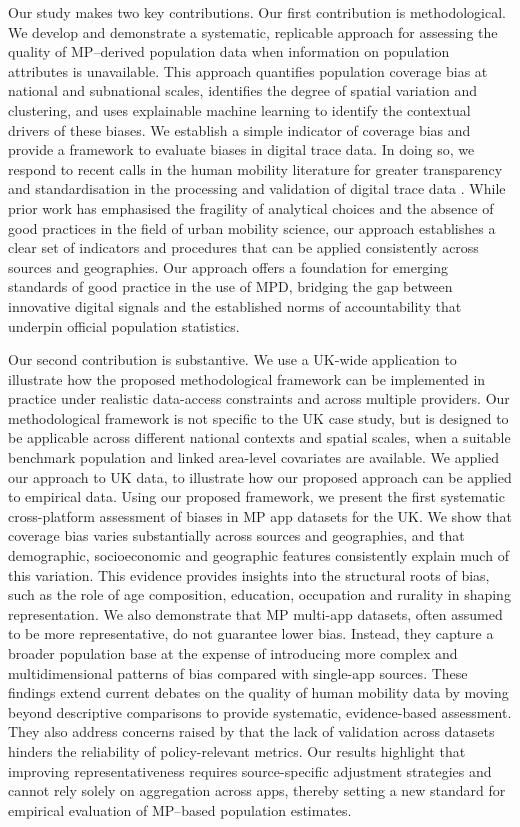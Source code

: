 \documentclass[]{rsos}%
\begin{document}
Our study makes two key contributions. Our first contribution is
methodological. We develop and demonstrate a systematic, replicable
approach for assessing the quality of MP--derived population data when
information on population attributes is unavailable. This approach
quantifies population coverage bias at national and subnational scales,
identifies the degree of spatial variation and clustering, and uses
explainable machine learning to identify the contextual drivers of these
biases. We establish a simple indicator of coverage bias and provide a
framework to evaluate biases in digital trace data. In doing so, we
respond to recent calls in the human mobility literature for greater
transparency and standardisation in the processing and validation of
digital trace data \citep{barreras2024exciting, unstatsMPDMS2025, UKGovPopulationMovement2025}. While prior work has emphasised the
fragility of analytical choices and the absence of good practices in the
field of urban mobility science, our approach establishes a clear set of
indicators and procedures that can be applied consistently across
sources and geographies. Our approach offers a foundation for emerging
standards of good practice in the use of MPD, bridging the gap between
innovative digital signals and the established norms of accountability
that underpin official population statistics.

Our second contribution is substantive. We use a UK-wide application to
illustrate how the proposed methodological framework can be implemented
in practice under realistic data-access constraints and across multiple
providers. Our methodological framework is not specific to the UK case
study, but is designed to be applicable across different national
contexts and spatial scales, when a suitable benchmark population and
linked area-level covariates are available. We applied our approach to
UK data, to illustrate how our proposed approach can be applied to
empirical data. Using our proposed framework, we present the first
systematic cross-platform assessment of biases in MP app datasets for
the UK. We show that coverage bias varies substantially across sources
and geographies, and that demographic, socioeconomic and geographic
features consistently explain much of this variation. This evidence
provides insights into the structural roots of bias, such as the role of
age composition, education, occupation and rurality in shaping
representation. We also demonstrate that MP multi-app datasets, often
assumed to be more representative, do not guarantee lower bias. Instead,
they capture a broader population base at the expense of introducing
more complex and multidimensional patterns of bias compared with
single-app sources. These findings extend current debates on the quality
of human mobility data by moving beyond descriptive comparisons to
provide systematic, evidence-based assessment. They also address
concerns raised by \citet{barreras2024exciting} that the lack of validation
across datasets hinders the reliability of policy-relevant metrics. Our
results highlight that improving representativeness requires
source-specific adjustment strategies and cannot rely solely on
aggregation across apps, thereby setting a new standard for empirical
evaluation of MP--based population estimates.
\end{document}
